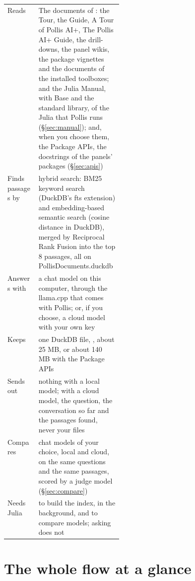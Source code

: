 \begin{center}\small
\renewcommand{\arraystretch}{1.25}
\begin{tabularx}{\linewidth}{@{}p{0.27\linewidth}L@{}}
\toprule
Reads & The documents of : the Tour, the Guide, A Tour of Pollis AI+, The Pollis AI+ Guide,
  the drill-downs, the panel wikis, the package vignettes and the documents of the installed toolboxes; and the
  Julia Manual, with Base and the standard library, of the Julia that Pollis runs (\S\ref{sec:manual}); and, when
  you choose them, the Package APIs, the docstrings of the panels' packages (\S\ref{sec:apis})\\
Finds passages by & hybrid search: BM25 keyword search (DuckDB's fts extension) and embedding-based semantic search
  (cosine distance in DuckDB), merged by Reciprocal Rank Fusion into the top 8 passages, all on PollisDocuments.duckdb\\
Answers with & a chat model on this computer, through the llama.cpp that comes with Pollis; or, if you choose, a
  cloud model with your own key\\
Keeps & one DuckDB file, , about 25 MB, or about 140 MB with the Package APIs\\
Sends out & nothing with a local model; with a cloud model, the question, the conversation so far and the passages
  found, never your files\\
Compares & chat models of your choice, local and cloud, on the same questions and the same passages, scored by a
  judge model (\S\ref{sec:compare})\\
Needs Julia & to build the index, in the background, and to compare models; asking does not\\
\bottomrule
\end{tabularx}
\end{center}

\section{The whole flow at a glance}

